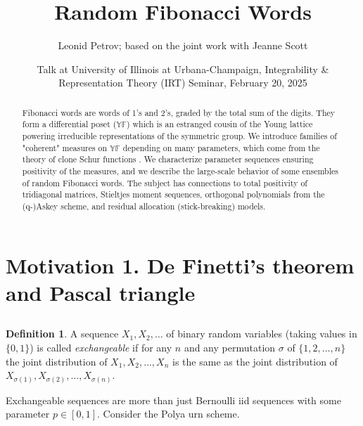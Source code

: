 \documentclass[letterpaper,11pt,oneside,reqno]{article}
\numberwithin{equation}{section}
\theoremstyle{definition}
\newtheorem{definition}[proposition]{Definition}
\begin{document}
\title{Random Fibonacci Words}


\author{Leonid Petrov; based on the joint work with Jeanne Scott \cite{PetrovScott2024Fibonacci}}

\date{Talk at University of Illinois at Urbana-Champaign, Integrability \& Representation Theory (IRT) Seminar, February 20, 2025}


\maketitle

\begin{abstract}
	Fibonacci words are words of 1's and 2's, graded by the total sum of the digits. They form a differential poset ($\mathbb{YF}$) which is an estranged cousin of the Young lattice powering irreducible representations of the symmetric group. We introduce families of "coherent" measures on $\mathbb{YF}$ depending on many parameters, which come from the theory of clone Schur functions \cite{okada1994algebras}. We characterize parameter sequences ensuring positivity of the measures, and we describe the large-scale behavior of some ensembles of random Fibonacci words. The subject has connections to total positivity of tridiagonal matrices, Stieltjes moment sequences, orthogonal polynomials from the (q-)Askey scheme, and residual allocation (stick-breaking) models.
\end{abstract}

\section{Motivation 1. De Finetti's theorem and Pascal triangle}

\subsection{}

\begin{definition}
	A sequence $X_1,X_2,\ldots $
	of binary random variables 
	(taking values in $\{0,1\}$)
	is called \emph{exchangeable}
	if for any $n$ and any permutation $\sigma$ of $\{1,2,\ldots,n\}$ the joint distribution of $X_1,X_2,\ldots,X_n$ is the same as the joint distribution of $X_{\sigma(1)},X_{\sigma(2)},\ldots,X_{\sigma(n)}$.
\end{definition}

Exchangeable sequences are more than just Bernoulli iid sequences with some
parameter $p\in[0,1]$. Consider the Polya urn scheme.
\end{document}
